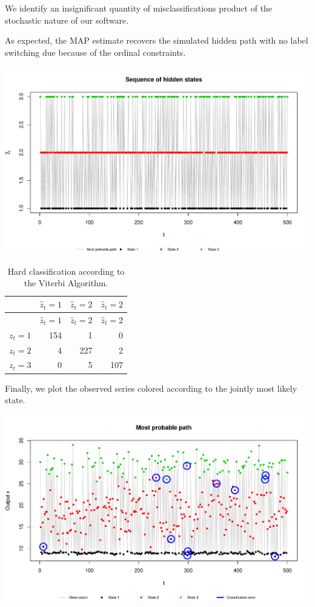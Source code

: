 \documentclass[]{article}
\begin{document}
{{{We identify an insignificant quantity of misclassifications product of
the stochastic nature of our software.

As expected, the MAP estimate recovers the simulated hidden path with no
label switching due because of the ordinal constraints.

\includegraphics[width=\textwidth]{main_pdf_files/figure-latex/hmm_walkthrough_statepath-1}

\begin{longtable}[]{@{}lrrr@{}}
\caption{Hard classification according to the Viterbi
Algorithm.}\tabularnewline
\toprule
& \(\hat{z}_t = 1\) & \(\hat{z}_t = 2\) &
\(\hat{z}_t = 2\)\tabularnewline
\midrule
\endfirsthead
\toprule
& \(\hat{z}_t = 1\) & \(\hat{z}_t = 2\) &
\(\hat{z}_t = 2\)\tabularnewline
\midrule
\endhead
\(z_t = 1\) & 154 & 1 & 0\tabularnewline
\(z_t = 2\) & 4 & 227 & 2\tabularnewline
\(z_t = 3\) & 0 & 5 & 107\tabularnewline
\bottomrule
\end{longtable}

Finally, we plot the observed series colored according to the jointly
most likely state.

\includegraphics[width=\textwidth]{main_pdf_files/figure-latex/hmm_walkthrough_outputvit-1}

}}}
\end{document}
